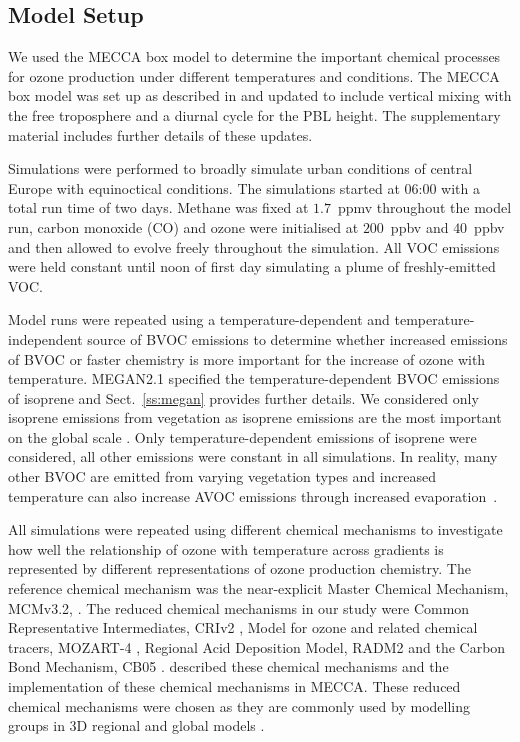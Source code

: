 \subsection{Model Setup} \label{ss:model_setup}
We used the MECCA box model to determine the important chemical processes for ozone production under different temperatures and  conditions.
The MECCA box model was set up as described in \citet{Coates:2015} and updated to include vertical mixing with the free troposphere and a diurnal cycle for the PBL height.
The supplementary material includes further details of these updates.

Simulations were performed to broadly simulate urban conditions of central Europe with equinoctical conditions.
The simulations started at 06:00 with a total run time of two days.
Methane was fixed at $1.7$~ppmv throughout the model run, carbon monoxide (CO) and ozone were initialised at $200$~ppbv and $40$~ppbv and then allowed to evolve freely throughout the simulation.
All VOC emissions were held constant until noon of first day simulating a plume of freshly-emitted VOC.

Model runs were repeated using a temperature-dependent and temperature-independent source of BVOC emissions to determine whether increased emissions of BVOC or faster chemistry is more important for the increase of ozone with temperature. 
MEGAN2.1 \citep{Guenther:2012} specified the temperature-dependent BVOC emissions of isoprene and Sect.~\ref{ss:megan} provides further details. 
We considered only isoprene emissions from vegetation as isoprene emissions are the most important on the global scale \citep{Guenther:2006}. 
Only temperature-dependent emissions of isoprene were considered, all other emissions were constant in all simulations.
In reality, many other BVOC are emitted from varying vegetation types \citep{Guenther:2006} and increased temperature can also increase AVOC emissions through increased \mbox{evaporation \citep{Rubin:2006}}.

All simulations were repeated using different chemical mechanisms to investigate how well the relationship of ozone with temperature across  gradients is represented by different representations of ozone production chemistry.
The reference chemical mechanism was the near-explicit Master Chemical Mechanism, MCMv3.2, \citep{Jenkin:1997, Jenkin:2003, Saunders:2003, MCM_Site}.
The reduced chemical mechanisms in our study were Common Representative Intermediates, CRIv2 \citep{Jenkin:2008}, Model for ozone and related chemical tracers, MOZART-4 \citep{Emmons:2010}, Regional Acid Deposition Model, RADM2 \citep{Stockwell:1990} and the Carbon Bond Mechanism, CB05 \citep{Yarwood:2005}. 
\citet{Coates:2015} described these chemical mechanisms and the implementation of these chemical mechanisms in MECCA.
These reduced chemical mechanisms were chosen as they are commonly used by modelling groups in 3D regional and global models \citep{Baklanov:2014}.

